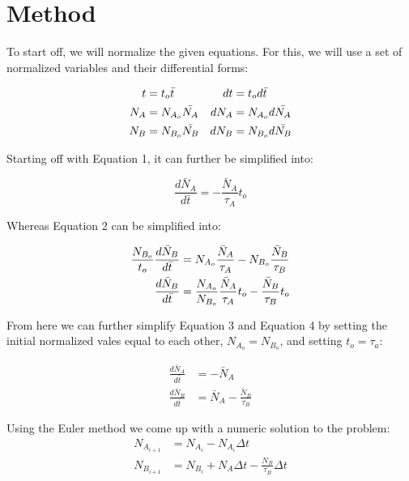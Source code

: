 \documentclass[pra,twocolumn,showpacs,amsmath,amssymb]{revtex4-2}
\begin{document}
\section{Method} \label{sec:method}


To start off, we will normalize the given equations. For this, we will use a set of normalized variables and their differential forms:

\begin{align}
    t &= t_{o}\bar{t} & dt &= t_{o}d\bar{t} \notag \\
    N_{A} &= N_{A_{o}}\bar{N_{A}} & dN_{A} &= N_{A_{o}}d\bar{N_{A}} \notag \\
    N_{B} &= N_{B_{o}}\bar{N_{B}} & dN_{B} &= N_{B_{o}}d\bar{N_{B}} \notag
\end{align}

\par Starting off with Equation 1, it can further be simplified into:

\begin{equation}
\frac{d\bar{N}_A}{d\bar{t}} = -\frac{\bar{N}_A}{\tau_A}t_o
\end{equation}

\par Whereas Equation 2 can be simplified into:

\begin{align}
\frac{N_{B_o}}{t_o} \frac{d\bar{N}_B}{d\bar{t}} &= N_{A_o} \frac{\bar{N}_A}{\tau_A} - N_{B_o} \frac{\bar{N}_B}{\tau_B} \notag \\
\frac{d\bar{N}_B}{d\bar{t}} &= \frac{N_{A_o}}{N_{B_o}} \frac{\bar{N}_A}{\tau_A} t_o - \frac{\bar{N}_B}{\tau_B} t_o
\end{align}

From here we can further simplify Equation 3 and Equation 4 by setting the initial normalized vales equal to each other, $N_{A_o} = N_{B_o}$, and setting \(t_o = \tau_a\):

\begin{align}
\frac{d\bar{N}_A}{d\bar{t}} &= -\bar{N}_A\\
\frac{d\bar{N}_B}{d\bar{t}} &= \bar{N}_A - \frac{\bar{N}_B}{\tau_B}
\end{align}

Using the Euler method we come up with a numeric solution to the problem:
\begin{align}
N_{A_{i+1}} &= N_{A_i} - N_{A_i} \Delta t\\
N_{B_{i+1}} &= N_{B_i} + N_A \Delta t - \frac{N_B}{\tau_B} \Delta t
\end{align}
\end{document}
